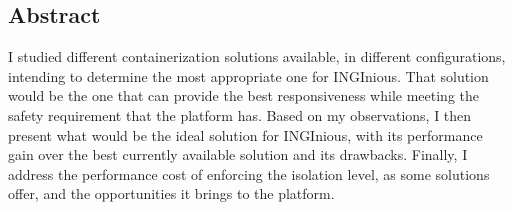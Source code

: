 \newpage
\begin{center}
  \section*{Abstract}
\end{center}

I studied different containerization solutions available, in different configurations, intending to determine the most appropriate one for INGInious.  That solution would be the one that can provide the best responsiveness while meeting the safety requirement that the platform has.  Based on my observations, I then present what would be the ideal solution for INGInious, with its performance gain over the best currently available solution and its drawbacks.  Finally, I address the performance cost of enforcing the isolation level, as some solutions offer, and the opportunities it brings to the platform.
